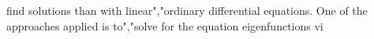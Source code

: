 {{{{{{{{{{ find solutions than with linear","ordinary differential equations. One of the approaches applied is to","solve for the equation eigenfunctions vi}}}}}}}}}}
